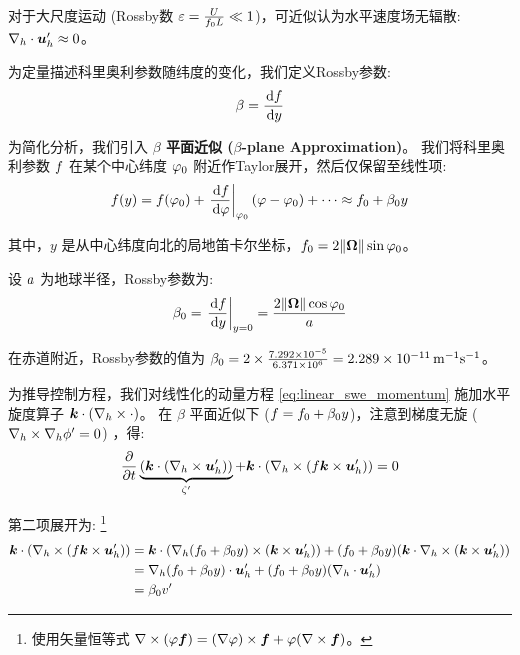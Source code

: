 对于大尺度运动 (Rossby数 $\varepsilon = \frac{U}{f_0 L} \ll 1$)，可近似认为水平速度场无辐散: $\nabla_h \cdot \bm{u}_h^\prime \approx 0$。

为定量描述科里奥利参数随纬度的变化，我们定义Rossby参数:
\begin{equation}
    \rossby = \ode{\coriolis}{y}
    \label{eq:rossby_parameter}
\end{equation}

为简化分析，我们引入\textbf{ $\beta$ 平面近似 ($\beta$-plane Approximation)}。
我们将科里奥利参数 $f$ 在某个中心纬度 $\varphi_0$ 附近作Taylor展开，然后仅保留至线性项:
\begin{equation}
    \coriolis(y) = \coriolis(\latitude_0) + \left.\ode{\coriolis}{\latitude}\right|_{\latitude_0} (\latitude - \latitude_0) + \dots \approx \coriolis_0 + \rossby_0 y
    \label{eq:beta_plane}
\end{equation}

其中，$y$ 是从中心纬度向北的局地笛卡尔坐标，$f_0 = 2\lVert \bm{\Omega} \rVert \sin\varphi_0$。

设 $a$ 为地球半径，Rossby参数为:
\begin{equation}
    \rossby_0 = \left.\ode{\coriolis}{y}\right|_{y = 0} = \frac{2 \norm{\rotationvec} \cos\latitude_0}{\earthradius}
    \label{eq:rossby_parameter_value}
\end{equation}

在赤道附近，Rossby参数的值为 $\beta_0 = 2 \times \frac{7.292 \times 10^{-5}}{6.371 \times 10^6} = 2.289 \times 10^{-11}\,\mathrm{m^{-1} s^{-1}}$。

为推导控制方程，我们对线性化的动量方程 \eqref{eq:linear_swe_momentum} 施加水平旋度算子 $\bm{k} \cdot (\nabla_h \times \cdot)$。
在 $\beta$ 平面近似下 ($f = f_0 + \beta_0 y$)，注意到梯度无旋 ($\nabla_h \times \nabla_h \phi^\prime = 0$) ，得:
\begin{equation*}
    \pde{}{\timevar}\underbrace{(\kvec \cdot (\nabla_h \times \vel_h^\prime))}_{\relvort^\prime} + \kvec \cdot (\nabla_h \times (\coriolis \kvec \times \vel_h^\prime)) = 0
\end{equation*}

第二项展开为:
\footnote{使用矢量恒等式 $\nabla \times (\varphi \bm{f}) = (\nabla \varphi) \times \bm{f} + \varphi (\nabla \times \bm{f})$。}
\begin{align*}
    \bm{k} \cdot (\nabla_h \times (f \bm{k} \times \bm{u}_h^\prime)) &= \bm{k} \cdot (\nabla_h(f_0 + \beta_0 y) \times (\bm{k} \times \bm{u}_h^\prime)) + (f_0 + \beta_0 y) (\bm{k} \cdot \nabla_h \times (\bm{k} \times \bm{u}_h^\prime)) \\
    &= \nabla_h(f_0 + \beta_0 y) \cdot \bm{u}_h^\prime + (f_0 + \beta_0 y) (\nabla_h \cdot \bm{u}_h^\prime) \\
    &= \beta_0 v^\prime
\end{align*}


